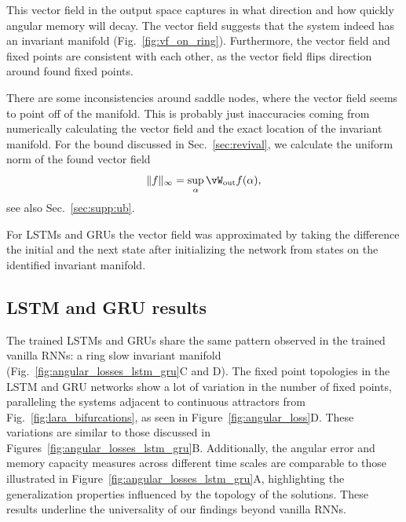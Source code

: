 \documentclass{article} %
\newcounter{ct}
\newcommand{\wout}{\vW_{\text{out}}}
\theoremstyle{definition}
\theoremstyle{remark}
\begin{document}
This vector field in the output space captures in what direction and how quickly angular memory will decay.
 The vector field  suggests that the system indeed has an invariant manifold (Fig.~\ref{fig:vf_on_ring}).
 Furthermore, the vector field and fixed points are consistent with each other, as the vector field flips direction around found fixed points.


 There are some inconsistencies around saddle nodes, where the vector field seems to point off of the manifold.
 This is probably just inaccuracies  coming from numerically calculating the vector field and the exact location of the invariant manifold.
For the bound discussed in Sec.~\ref{sec:revival}, we calculate the uniform norm of the found vector field
\begin{equation}\|f\|_{\infty} = \sup_{\alpha} \wout f(\alpha),\end{equation} see also Sec.~\ref{sec:supp:ub}.

For LSTMs and GRUs the  vector field was approximated by taking the difference the initial and the next state after initializing the network from states on the identified invariant manifold.



\newpage
\subsection{LSTM and GRU results}

The trained LSTMs and GRUs share the same pattern observed in the trained vanilla RNNs: a ring slow invariant manifold (Fig.~\ref{fig:angular_losses_lstm_gru}C and D).
The fixed point topologies in the LSTM and GRU networks show a lot of variation in the number of fixed points, paralleling the systems adjacent to continuous attractors from Fig.~\ref{fig:lara_bifurcations}, as seen in Figure~\ref{fig:angular_loss}D. These variations are similar to those discussed in Figures~\ref{fig:angular_losses_lstm_gru}B.
Additionally, the angular error and memory capacity measures across different time scales are comparable to those illustrated in Figure~\ref{fig:angular_losses_lstm_gru}A, highlighting the generalization properties influenced by the topology of the solutions.
These results underline the universality of our findings beyond vanilla RNNs.
\end{document}
